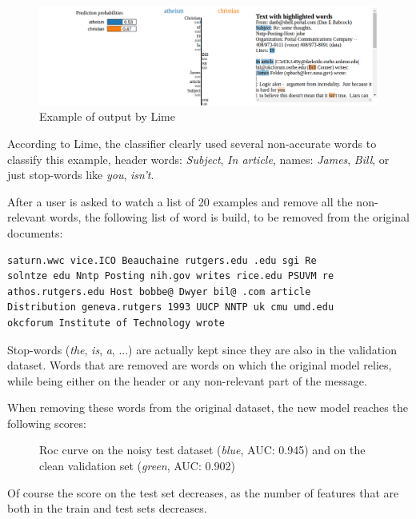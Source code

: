 \documentclass[a4paper,11pt]{kth-mag}
\begin{document}
\begin{figure}[!h]
	\centering
   	\def\svgwidth{\columnwidth}
	\includegraphics[scale=0.35]{lime-output.png}
    \caption{Example of output by Lime}
\end{figure}

According to Lime, the classifier clearly used several non-accurate words to classify this example, header words: \textit{Subject}, \textit{In article}, names: \textit{James}, \textit{Bill}, or just stop-words like \textit{you}, \textit{isn't}.

After a user is asked to watch a list of 20 examples and remove all the non-relevant words, the following list of word is build, to be removed from the original documents:

\begin{center}
\begin{verbatim}
saturn.wwc vice.ICO Beauchaine rutgers.edu .edu sgi Re
solntze edu Nntp Posting nih.gov writes rice.edu PSUVM re
athos.rutgers.edu Host bobbe@ Dwyer bil@ .com article
Distribution geneva.rutgers 1993 UUCP NNTP uk cmu umd.edu
okcforum Institute of Technology wrote
\end{verbatim}
\end{center}

Stop-words (\textit{the}, \textit{is}, \textit{a}, ...) are actually kept since they are also in the validation dataset. Words that are removed are words on which the original model relies, while being either on the header or any non-relevant part of the message.

When removing these words from the original dataset, the new model reaches the following scores:

\begin{figure}[h]
		\centering
    	\def\svgwidth{\columnwidth}
    	\resizebox{0.75\textwidth}{!}{}
    	\caption{Roc curve on the noisy test dataset (\textit{blue}, AUC: 0.945) and on the clean validation set (\textit{green}, AUC: 0.902)}
\end{figure}

Of course the score on the test set decreases, as the number of features that are both in the train and test sets decreases.
\end{document}

